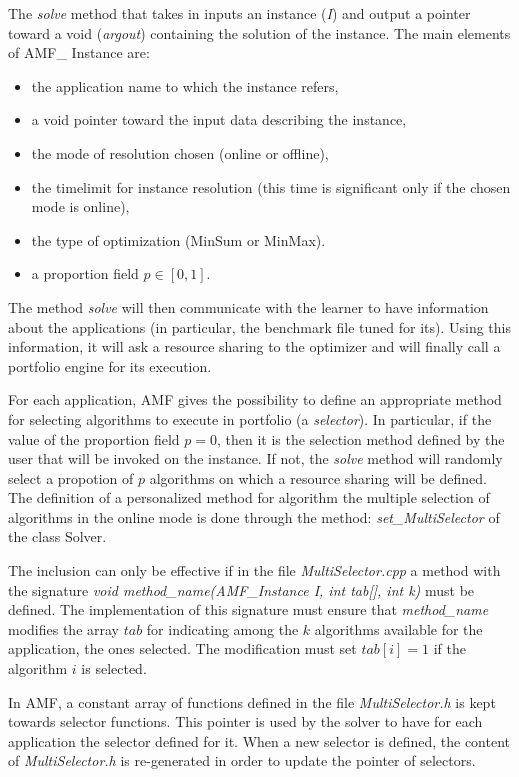 The \textit{solve} method that takes in inputs an instance (\textit{I}) and output a pointer 
toward a void (\textit{argout}) containing the solution of the instance. The main elements of AMF\_ Instance are:
\begin{itemize}
\item the application name to which the instance refers,
\item a void pointer toward the input data describing the instance,
\item the mode of resolution chosen (online or offline),
\item the timelimit for instance resolution (this time is significant only if the chosen mode is online),
\item the type of optimization (MinSum or MinMax).
\item a proportion field $p \in [0,1]$.
\end{itemize}

The method \textit{solve} will then communicate with the learner to have information about the applications (in 
particular, the benchmark file tuned for its). Using this information, it will ask a resource 
sharing to the optimizer and will finally call a portfolio engine for its execution.

For each application, AMF gives the possibility to define an appropriate method for selecting 
algorithms to execute in portfolio (a \textit{selector}). In particular, if the value of the proportion field $p = 0$, 
then it is the selection method defined by the user that will be invoked on the instance. If not, 
the \textit{solve} method will randomly select a propotion of $p$ algorithms on which a resource 
sharing will be defined. The definition of a personalized method for algorithm the multiple 
selection of algorithms in the online mode is done through the method: \textit{set\_MultiSelector} of the class Solver.  

The inclusion can only be effective if in the file \textit{MultiSelector.cpp} a method with the 
signature \textit{void method\_name(AMF\_Instance I, int tab[], int k)} must be defined. 
The implementation of this signature must ensure that \textit{method\_name}  modifies 
the array $tab$ for indicating among the $k$ algorithms available for the application, the 
ones selected. The modification must set $tab[i] = 1$ if the algorithm $i$ is selected. 

In AMF, a constant array of functions defined in the file \textit{MultiSelector.h} is kept towards 
selector functions. This pointer is used by the solver to have for each application the selector defined 
for it. When a new selector is defined, the content of \textit{MultiSelector.h} is re-generated in order 
to update the pointer of selectors. 

